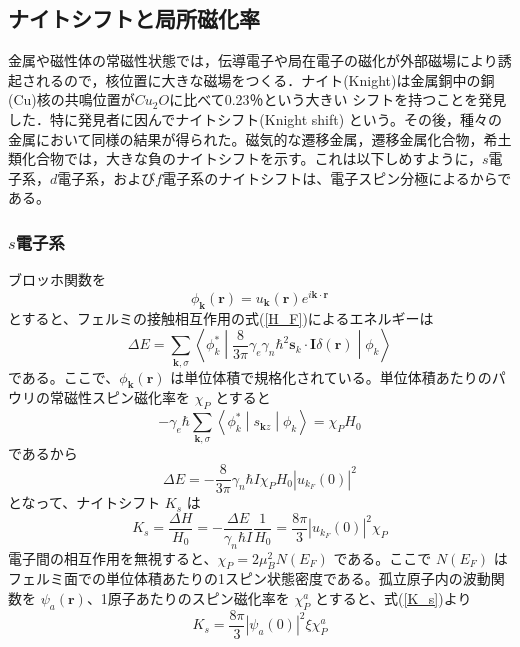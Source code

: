 \documentclass[11pt,a4j]{jreport}
\begin{document}
\subsection{ナイトシフトと局所磁化率}
金属や磁性体の常磁性状態では，伝導電子や局在電子の磁化が外部磁場により誘起されるので，核位置に大きな磁場をつくる．ナイト(Knight)は金属銅中の銅(Cu)核の共鳴位置が$Cu_2O$に比べて0.23％という大きい
シフトを持つことを発見した．特に発見者に因んでナイトシフト(Knight shift) という。その後，種々の金属において同様の結果が得られた。磁気的な遷移金属，遷移金属化合物，希土類化合物では，大きな負のナイトシフトを示す。これは以下しめすように，$s$電子系，$d$電子系，および$f$電子系のナイトシフトは、電子スピン分極によるからである。
\subsubsection{$s$電子系}
ブロッホ関数を
\begin{equation}
  \phi_{\bm{k}}(\bm{r}) = u_{\bm{k}}(\bm{r}) e^{i \bm{k} \cdot \bm{r}}
\end{equation}
とすると、フェルミの接触相互作用の式(\ref{H_F})によるエネルギーは
\begin{equation}
  \Delta E = \sum_{\bm{k}, \sigma} \left\langle \phi_k^* \middle| \frac{8}{3 \pi} \gamma_e \gamma_n \hbar^2 \bm{s}_k \cdot \bm{I} \delta(\bm{r}) \middle| \phi_k \right\rangle
\end{equation}
である。ここで、\(\phi_{\bm{k}}(\bm{r})\) は単位体積で規格化されている。単位体積あたりのパウリの常磁性スピン磁化率を \(\chi_P\) とすると
\begin{equation}
  -\gamma_e\hbar \sum_{\bm{k},\sigma} \left\langle \phi_k^* \middle| s_{\bm{k}z} \middle| \phi_k \right\rangle = \chi_P H_0
\end{equation}
であるから
\begin{equation}
  \Delta E = -\frac{8}{3 \pi} \gamma_n \hbar I \chi_P H_0 | u_{k_F}(0) |^2
\end{equation}
となって、ナイトシフト \(K_s\) は
\begin{equation}
  K_s = \frac{\Delta H}{H_0} = - \frac{\Delta E}{\gamma_n \hbar I} \frac{1}{H_0} = \frac{8 \pi}{3} | u_{k_F}(0) |^2 \chi_P
  \label{K_s}
\end{equation}
電子間の相互作用を無視すると、\(\chi_P = 2 \mu_B^2 N(E_F)\) である。ここで \(N(E_F)\) はフェルミ面での単位体積あたりの1スピン状態密度である。孤立原子内の波動関数を \(\psi_a(\bm{r})\)、1原子あたりのスピン磁化率を \(\chi_P^a\) とすると、式(\ref{K_s})より
\begin{equation}
  K_s = \frac{8 \pi}{3} |\psi_a(0)|^2 \xi \chi_P^a
\end{equation}
\end{document}
